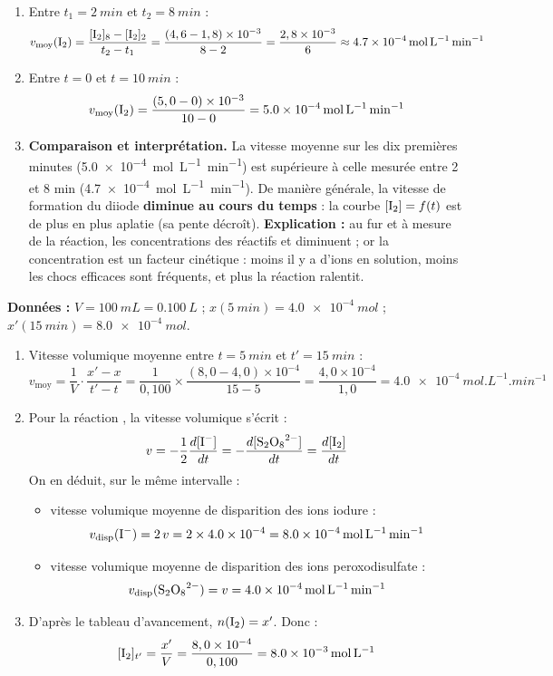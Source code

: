 \documentclass[11pt]{article}
\begin{document}
\begin{corrige}
\begin{enumerate}
\item Entre $t_1 = \SI{2}{min}$ et $t_2 = \SI{8}{min}$ :
\[ v_{\text{moy}}(\ce{I2}) = \frac{[\ce{I2}]_{8} - [\ce{I2}]_{2}}{t_2 - t_1} = \frac{(4,6 - 1,8)\times 10^{-3}}{8 - 2} = \frac{2,8\times 10^{-3}}{6} \approx \SI{4,7e-4}{mol.L^{-1}.min^{-1}} \]
\item Entre $t = 0$ et $t = \SI{10}{min}$ :
\[ v_{\text{moy}}(\ce{I2}) = \frac{(5,0 - 0)\times 10^{-3}}{10 - 0} = \SI{5,0e-4}{mol.L^{-1}.min^{-1}} \]
\item \textbf{Comparaison et interprétation.} La vitesse moyenne sur les dix premières minutes (\SI{5,0e-4}{mol.L^{-1}.min^{-1}}) est supérieure à celle mesurée entre 2 et 8 min (\SI{4,7e-4}{mol.L^{-1}.min^{-1}}). De manière générale, la vitesse de formation du diiode \textbf{diminue au cours du temps} : la courbe $[\ce{I2}] = f(t)$ est de plus en plus aplatie (sa pente décroît). \textbf{Explication :} au fur et à mesure de la réaction, les concentrations des réactifs  et  diminuent ; or la concentration est un facteur cinétique : moins il y a d'ions en solution, moins les chocs efficaces sont fréquents, et plus la réaction ralentit.
\end{enumerate}
\end{corrige}

\begin{corrige}
\textbf{Données :} $V = \SI{100}{mL} = \SI{0,100}{L}$ ; $x(\SI{5}{min}) = \SI{4,0e-4}{mol}$ ; $x'(\SI{15}{min}) = \SI{8,0e-4}{mol}$.
\begin{enumerate}
\item Vitesse volumique moyenne entre $t = \SI{5}{min}$ et $t' = \SI{15}{min}$ :
\[ v_{\text{moy}} = \frac{1}{V}\cdot\frac{x' - x}{t' - t} = \frac{1}{0,100}\times\frac{(8,0 - 4,0)\times 10^{-4}}{15 - 5} = \frac{4,0\times 10^{-4}}{1,0} = \SI{4,0e-4}{mol.L^{-1}.min^{-1}} \]
\item Pour la réaction , la vitesse volumique s'écrit :
\[ v = -\frac{1}{2}\frac{d[\ce{I-}]}{dt} = -\frac{d[\ce{S2O8^2-}]}{dt} = \frac{d[\ce{I2}]}{dt} \]
On en déduit, sur le même intervalle :
\begin{itemize}
\item vitesse volumique moyenne de disparition des ions iodure :
\[ v_{\text{disp}}(\ce{I-}) = 2\,v = 2 \times \SI{4,0e-4}{} = \SI{8,0e-4}{mol.L^{-1}.min^{-1}} \]
\item vitesse volumique moyenne de disparition des ions peroxodisulfate :
\[ v_{\text{disp}}(\ce{S2O8^2-}) = v = \SI{4,0e-4}{mol.L^{-1}.min^{-1}} \]
\end{itemize}
\item D'après le tableau d'avancement, $n(\ce{I2}) = x'$. Donc :
\[ [\ce{I2}]_{t'} = \frac{x'}{V} = \frac{8,0\times 10^{-4}}{0,100} = \SI{8,0e-3}{mol.L^{-1}} \]
\end{enumerate}
\end{corrige}
\end{document}
